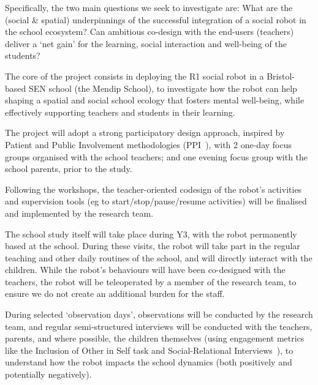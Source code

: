 \documentclass[11pt,a4paper]{report}
\begin{document}
Specifically, the two main questions we seek to investigate are: What are the
(social \& spatial) underpinnings of the successful integration of a social
robot in the school ecosystem? Can ambitious co-design with the end-users
(teachers) deliver a `net gain' for the learning, social interaction and
well-being of the students? 


The core of the project consists in deploying the R1 social robot in a
Bristol-based SEN school (the Mendip School), to investigate how the robot can
help shaping a spatial and social school ecology that fosters mental well-being,
while effectively supporting teachers and students in their learning. 

The project will adopt a strong participatory design approach, inspired by
Patient and Public Involvement methodologies (PPI~\cite{boivin2010patient}), with 2 one-day
focus groups organised with the school teachers; and one evening focus group with the
school parents, prior to the study.


Following the workshops, the teacher-oriented codesign of the robot's activities
and supervision tools (eg to start/stop/pause/resume activities) will be
finalised and implemented by the research team.

The school study itself will take place during Y3, with the robot permanently
based at the school. During these visits, the robot will take part in the
regular teaching and other daily routines of the school, and will directly
interact with the children. While the robot's behaviours will have been
co-designed with the teachers, the robot will be teleoperated by a member of the
research team, to ensure we do not create an additional burden for the staff. 

During selected `observation days', observations will be conducted by the research team,
and regular semi-structured interviews will be conducted with the teachers,
parents, and where possible, the children themselves (using engagement metrics
like the Inclusion of Other in Self task
and Social-Relational Interviews~\cite{westlund2017measuring}), to understand how the
robot impacts the school dynamics  (both positively and potentially negatively).
\end{document}
